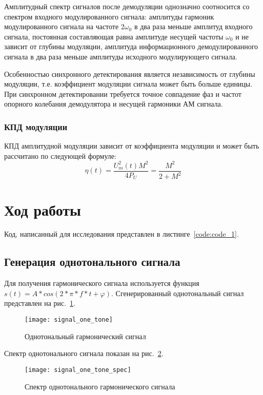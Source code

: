 Амплитудный спектр сигналов после демодуляции однозначно соотносится со спектром входного модулированного сигнала: 
амплитуды гармоник модулированного сигнала на частоте 2$\omega_0$ в два раза меньше амплитуд входного сигнала,
 постоянная составляющая равна амплитуде несущей частоты $\omega_0$ и не зависит от глубины модуляции, амплитуда
  информационного демодулированного сигнала в два раза меньше амплитуды исходного модулирующего сигнала. 

Особенностью синхронного детектирования является независимость от глубины модуляции,
 т.е. коэффициент модуляции сигнала может быть больше единицы. 
 При синхронном детектировании требуется точное совпадение фаз и частот 
 опорного колебания демодулятора и несущей гармоники АМ сигнала.

\subsubsection{КПД модуляции}
КПД амплитудной модуляции зависит от коэффициента модуляции и может быть рассчитано по следующей формуле:
 \begin{equation}
	\eta (t) =\frac{ U_m^2(t) M^2}{4 P_U}  = \frac{M^2}{2 + M^2} 
\end{equation}



\section{Ход работы}
Код, написанный для исследования представлен в листинге~\ref{code:code_1}.

\subsection{Генерация однотонального сигнала}
Для получения гармонического сигнала используется функция $s(t) = A*cos(2*\pi * f*t + \varphi)$.
Сгенерированный однотональный сигнал представлен на рис.~\ref{pic:signal_one_tone}.
\begin{figure}[H]
	\begin{center}
		\texttt{[image: signal\_one\_tone]}
		\caption{Однотональный гармонический сигнал}
		\label{pic:signal_one_tone} %
	\end{center}
\end{figure}
Спектр однотонального сигнала показан на рис.~\ref{pic:signal_one_tone_spec}.
\begin{figure}[H]
	\begin{center}
		\texttt{[image: signal\_one\_tone\_spec]}
		\caption{Спектр однотонального гармонического сигнала}
		\label{pic:signal_one_tone_spec} %
	\end{center}
\end{figure}

